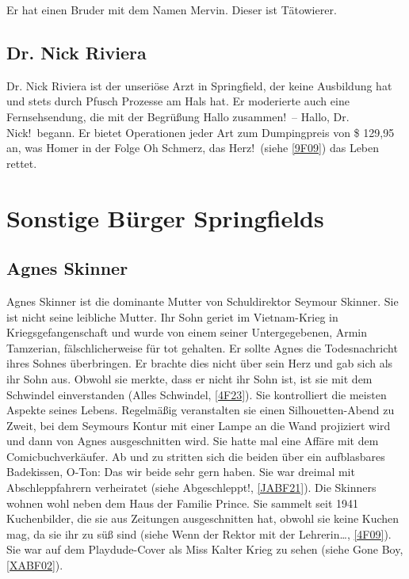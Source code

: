 Er hat einen Bruder mit dem Namen Mervin. Dieser ist Tätowierer.


\subsection{Dr. Nick Riviera}
Dr. Nick Riviera ist der unseriöse Arzt in Springfield, der keine Ausbildung hat und stets durch Pfusch Prozesse am Hals hat. Er moderierte auch eine Fernsehsendung, die mit der Begrüßung \glqq Hallo zusammen!\grqq\ -- \glqq Hallo, Dr. Nick!\grqq\ begann. Er bietet Operationen jeder Art zum Dumpingpreis von \$ 129,95 an, was Homer in der Folge \glqq Oh Schmerz, das Herz!\grqq\ (siehe \ref{9F09}) das Leben rettet.


\section{Sonstige Bürger Springfields}

\subsection{Agnes Skinner}\label{AgnesSkinner}
Agnes Skinner ist die dominante Mutter von Schuldirektor Seymour Skinner. Sie ist nicht seine leibliche Mutter. Ihr Sohn geriet im Vietnam-Krieg in Kriegsgefangenschaft und wurde von einem seiner Untergegebenen, Armin Tamzerian, fälschlicherweise für tot gehalten. Er sollte Agnes die Todesnachricht ihres Sohnes überbringen. Er brachte dies nicht über sein Herz und gab sich als ihr Sohn aus. Obwohl sie merkte, dass er nicht ihr Sohn ist, ist sie mit dem Schwindel einverstanden (\glqq Alles Schwindel\grqq , \ref{4F23}). Sie kontrolliert die meisten Aspekte seines Lebens. Regelmäßig veranstalten sie einen Silhouetten-Abend zu Zweit, bei dem Seymours Kontur mit einer Lampe an die Wand projiziert wird und dann von Agnes ausgeschnitten wird. Sie hatte mal eine Affäre mit dem Comicbuchverkäufer. Ab und zu stritten sich die beiden über ein aufblasbares Badekissen, O-Ton: \glqq Das wir beide sehr gern haben\grqq . Sie war dreimal mit Abschleppfahrern verheiratet (siehe \glqq Abgeschleppt!\grqq , \ref{JABF21}). Die Skinners wohnen wohl neben dem Haus der Familie Prince. Sie sammelt seit 1941 Kuchenbilder, die sie aus Zeitungen ausgeschnitten hat, obwohl sie keine Kuchen mag, da sie ihr zu süß sind (siehe \glqq Wenn der Rektor mit der Lehrerin\dots\grqq , \ref{4F09}). Sie war auf dem Playdude-Cover als Miss Kalter Krieg zu sehen (siehe \glqq Gone Boy\grqq, \ref{XABF02}).

